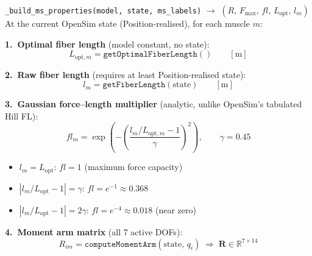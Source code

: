 \documentclass[11pt,a4paper]{article}
\newcommand{\R}{\mathbb{R}}
\newcommand{\bR}{\bm{R}}
\begin{document}
\begin{eqbox}{\texttt{\_build\_ms\_properties(model, state, ms\_labels)}
  $\to$ $(R,\,F_\text{max},\,fl,\,L_\text{opt},\,l_m)$}
At the current OpenSim state (Position-realised), for each muscle $m$:

\textbf{1.\ Optimal fiber length} (model constant, no state):
\begin{equation}
L_{\text{opt},m} = \texttt{getOptimalFiberLength}()
\qquad [\text{m}]
\end{equation}

\textbf{2.\ Raw fiber length} (requires at least Position-realised state):
\begin{equation}
l_m = \texttt{getFiberLength}(\text{state})
\qquad [\text{m}]
\end{equation}

\textbf{3.\ Gaussian force--length multiplier} (analytic, unlike OpenSim's
tabulated Hill FL):
\begin{equation}
\boxed{fl_m = \exp\!\left(-\!\left(\frac{l_m/L_{\text{opt},m} - 1}{\gamma}\right)^{\!2}\right)},
\qquad \gamma = 0.45
\end{equation}
\begin{itemize}\itemsep0pt
  \item $l_m = L_\text{opt}$: $fl = 1$ (maximum force capacity)
  \item $|l_m/L_\text{opt} - 1| = \gamma$: $fl = e^{-1} \approx 0.368$
  \item $|l_m/L_\text{opt} - 1| = 2\gamma$: $fl = e^{-4} \approx 0.018$ (near zero)
\end{itemize}

\textbf{4.\ Moment arm matrix} (all 7 active DOFs):
\begin{equation}
R_{im} = \texttt{computeMomentArm}(\text{state},\,q_i)
\;\Rightarrow\; \bR \in \R^{7\times14}
\end{equation}
\end{eqbox}
\end{document}
